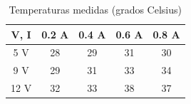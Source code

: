 \begin{table}[H]
    \centering
    \caption{Temperaturas medidas (grados Celsius)}
    \begin{tabular}{|c|c|c|c|c|}
        \hline
        V, I & 0.2 A & 0.4 A & 0.6 A &  0.8 A\\
        \hline
        5 V & 28 & 29 & 31 & 30 \\
        \hline
        9 V & 29 & 31 & 33 & 34 \\
        \hline
        12 V & 32 & 33 & 38 & 37 \\
        \hline
    \end{tabular}
    \label{tab:datos}
\end{table}


